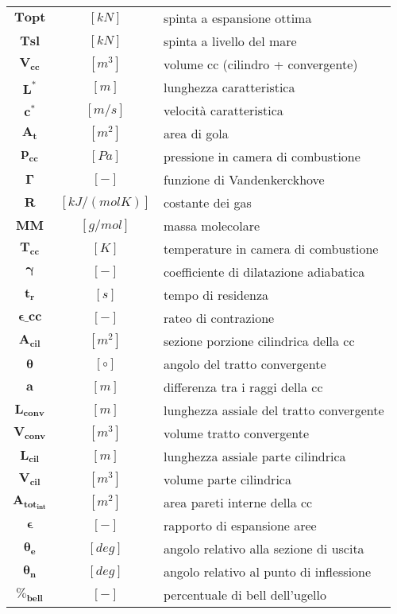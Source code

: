 \begin{multicols}{2}
\begin{tabularx}{\linewidth}{cc>{\raggedright\arraybackslash}X}
		$\bm{T{opt}}$ & $[kN]$ & spinta a espansione ottima \\
		$\bm{T{sl}}$ & $[kN]$ & spinta a livello del mare \\
		$\bm{V_{cc}  }$ & $[m^3]$ & volume cc (cilindro + convergente) \\
		$\bm{L^* }$ & $[m]$ & lunghezza caratteristica \\
		$\bm{c^* }$ & $[m/s]$ & velocità caratteristica \\
		$\bm{A_{t} }$ & $[m^2]$ & area di gola \\
	    $\bm{p_{cc} }$ & $[Pa]$ & pressione in camera di combustione \\
	    $\bm{\Gamma}$ & $[-]$ & funzione di Vandenkerckhove \\
		$\bm{R}$ & $[kJ/(molK)]$ & costante dei gas \\
	    $\bm{MM}$ & $[g/mol]$ & massa molecolare \\
	    $\bm{T_{cc} }$ & $[K]$ & temperature in camera di combustione \\
		$\bm{\gamma}$ & $[-]$ & coefficiente di dilatazione adiabatica \\
	    $\bm{t_{r} }$ & $[s]$ & tempo di residenza \\
	    $\bm{\epsilon\_{cc} }$ & $[-]$ & rateo di contrazione             \\
		$\bm{A_{cil} }$ & $[m^2]$ & sezione porzione cilindrica della cc \\
	    $\bm{\theta}$ & $[\circ]$ & angolo del tratto convergente   \\
	    $\bm{a}$ & $[m]$ & differenza tra i raggi della cc \\
		$\bm{L_{conv}}$ & $[m]$ & lunghezza assiale del tratto convergente \\
	    $\bm{V_{conv} }$ & $[m^3]$ & volume tratto convergente  \\
	    $\bm{L_{cil} }$ & $[m]$ & lunghezza assiale parte cilindrica \\
		$\bm{V_{cil} }$ & $[m^3]$ & volume parte cilindrica \\
	    $\bm{A_{tot_{int}}}$ & $[m^2]$ & area pareti interne della cc \\
		$\bm{\epsilon}$ & $[-]$ & rapporto di espansione aree \\
		$\bm{\theta_e}$ & $[deg]$ & angolo relativo alla sezione di uscita \\
		$\bm{\theta_n}$ & $[deg]$ & angolo relativo al punto di inflessione \\
        $\bm{\%_{bell} }$ & $[-]$ & percentuale di bell dell’ugello \\

\end{tabularx}
\end{multicols}
